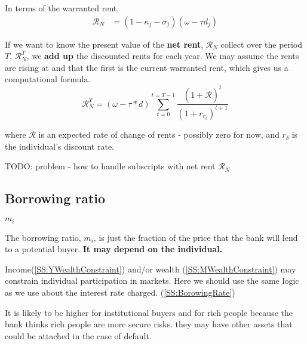 In terms of the warranted rent, 
\begin{align}
\mathcal{R}_N &= (1-\kappa_j - \sigma_j)(\omega - \tau d_j)
\end{align}



If we want to know the  present value  of the \textbf{net rent}, $\mathcal{R}_N$  collect over the period  $T$, $\mathcal{R}_N^T$, we \textbf{add up} the discounted rents for each year. We may assume the rents are rising at and that the first is the current warranted rent, which gives us a computational formula. 
\[\mathcal{R}_N^T= (\omega-\tau*d)\sum_{t=0}^{t=T-1} \frac{(1+\dot{\mathcal{R}})^{t}} {(1+r_{r_\delta})^{t+1}} \]


\noindent where $\dot{\mathcal{R}}$ is an expected rate of change of rents - possibly zero for now, and $r_\delta$ is the individual's discount rate. 

TODO: problem - how to handle subscripts with net rent $\mathcal{R}_N$



\subsection{Borrowing ratio}\label{SS:BorrowingRatio}
$m_i$

The borrowing ratio, $m_i$, is just the fraction of the price that the bank will lend to a potential buyer. \textbf{It may depend on the individual.} 

Income(\ref{SS:YWealthConstraint}) and/or wealth (\ref {SS:MWealthConstraint}) may constrain individual participation in markets. 
Here we should use the same logic as we use about the interest rate charged. (\ref{SS:BorowingRate})


It is likely to be higher for institutional buyers  and for rich people because the bank thinks rich people are more secure risks. they may have other assets that could be attached in the case of default.



